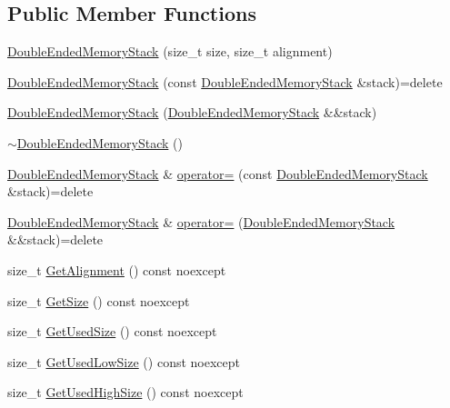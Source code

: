 \subsection*{Public Member Functions}
\begin{DoxyCompactItemize}
\item 
\hyperlink{classmage_1_1_double_ended_memory_stack_a6480666c03ac703fc4fd5a62a766438d}{Double\+Ended\+Memory\+Stack} (size\+\_\+t size, size\+\_\+t alignment)
\item 
\hyperlink{classmage_1_1_double_ended_memory_stack_a8a903d4a209929854a6f50cf98e3e2da}{Double\+Ended\+Memory\+Stack} (const \hyperlink{classmage_1_1_double_ended_memory_stack}{Double\+Ended\+Memory\+Stack} \&stack)=delete
\item 
\hyperlink{classmage_1_1_double_ended_memory_stack_a7abcd518d3a809f0689a36e57047dd2c}{Double\+Ended\+Memory\+Stack} (\hyperlink{classmage_1_1_double_ended_memory_stack}{Double\+Ended\+Memory\+Stack} \&\&stack)
\item 
\hyperlink{classmage_1_1_double_ended_memory_stack_afaac4a28ea1e386bc83d3e07fd5531a0}{$\sim$\+Double\+Ended\+Memory\+Stack} ()
\item 
\hyperlink{classmage_1_1_double_ended_memory_stack}{Double\+Ended\+Memory\+Stack} \& \hyperlink{classmage_1_1_double_ended_memory_stack_aafcc4b3cd8d87d75cc3de53994b6ef7e}{operator=} (const \hyperlink{classmage_1_1_double_ended_memory_stack}{Double\+Ended\+Memory\+Stack} \&stack)=delete
\item 
\hyperlink{classmage_1_1_double_ended_memory_stack}{Double\+Ended\+Memory\+Stack} \& \hyperlink{classmage_1_1_double_ended_memory_stack_a95b220925f1ef732c104901c3f55015d}{operator=} (\hyperlink{classmage_1_1_double_ended_memory_stack}{Double\+Ended\+Memory\+Stack} \&\&stack)=delete
\item 
size\+\_\+t \hyperlink{classmage_1_1_double_ended_memory_stack_a6f2d4036e67cca2836293ad421ddfdfd}{Get\+Alignment} () const noexcept
\item 
size\+\_\+t \hyperlink{classmage_1_1_double_ended_memory_stack_a68d69d69243d5ef8a9fd12b7d7a42993}{Get\+Size} () const noexcept
\item 
size\+\_\+t \hyperlink{classmage_1_1_double_ended_memory_stack_ae9c3c9a0f4e330b20ef63e0a21b91459}{Get\+Used\+Size} () const noexcept
\item 
size\+\_\+t \hyperlink{classmage_1_1_double_ended_memory_stack_af7fd015832d8c6c56619917492e62a2e}{Get\+Used\+Low\+Size} () const noexcept
\item 
size\+\_\+t \hyperlink{classmage_1_1_double_ended_memory_stack_a1c037a0084cfa806c6a519fd3208cd49}{Get\+Used\+High\+Size} () const noexcept

\end{DoxyCompactItemize}
